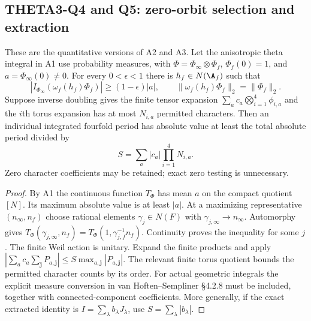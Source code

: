 \subsection{THETA3-Q4 and Q5: zero-orbit selection and extraction}\label{Q4}\label{Q5}
These are the quantitative versions of A2 and A3. Let the anisotropic theta integral in A1 use probability measures, with
$\Phi=\Phi_\infty\otimes\Phi_f$, $\Phi_f(0)=1$, and
$a=\Phi_\infty(0)\ne0$. For every $0<\epsilon<1$ there is
$h_f\in N(\A_f)$ such that
\begin{equation}\label{eq:finite-selection}
 |I_{\Phi_\infty}(\omega_f(h_f)\Phi_f)|\geq(1-\epsilon)|a|,
 \qquad\|\omega_f(h_f)\Phi_f\|_2=\|\Phi_f\|_2.
\end{equation}
Suppose inverse doubling gives the finite tensor expansion
$\sum_a c_a\bigotimes_{i=1}^4\phi_{i,a}$ and the $i$th torus expansion has at most $N_{i,a}$ permitted characters. Then an individual integrated fourfold period has absolute value at least the total absolute period divided by
\begin{equation}\label{eq:loss}
 S=\sum_a |c_a|\prod_{i=1}^4N_{i,a}.
\end{equation}
Zero character coefficients may be retained; exact zero testing is unnecessary.
\begin{proof}
By A1 the continuous function $T_\Phi$ has mean $a$ on the compact quotient $[N]$. Its maximum absolute value is at least $|a|$. At a maximizing representative $(n_\infty,n_f)$ choose rational elements $\gamma_j\in N(F)$ with $\gamma_{j,\infty}\to n_\infty$. Automorphy gives
$T_\Phi(\gamma_{j,\infty},n_f)=T_\Phi(1,\gamma_{j,f}^{-1}n_f)$.
Continuity proves the inequality for some $j$. The finite Weil action is unitary. Expand the finite products and apply
$|\sum_a c_a\sum_{\mathbf j}P_{a,\mathbf j}|
\leq S\max_{a,\mathbf j}|P_{a,\mathbf j}|$.
The relevant finite torus quotient bounds the permitted character counts by its order. For actual geometric integrals the explicit measure conversion in van Hoften--Sempliner \S4.2.8 must be included, together with connected-component coefficients. More generally, if the exact extracted identity is $I=\sum_\lambda b_\lambda J_\lambda$, use $S=\sum_\lambda|b_\lambda|$.
\end{proof}

